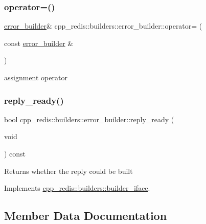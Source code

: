 \subsubsection{\texorpdfstring{operator=()}{operator=()}}
{\footnotesize\ttfamily \hyperlink{classcpp__redis_1_1builders_1_1error__builder}{error\+\_\+builder}\& cpp\+\_\+redis\+::builders\+::error\+\_\+builder\+::operator= (\begin{DoxyParamCaption}\item[{const \hyperlink{classcpp__redis_1_1builders_1_1error__builder}{error\+\_\+builder} \&}]{ }\end{DoxyParamCaption})\hspace{0.3cm}{\ttfamily [delete]}}



assignment operator 

\mbox{\label{classcpp__redis_1_1builders_1_1error__builder_af3d67647f012d0a7378684e2f8258a6d}} 
\subsubsection{\texorpdfstring{reply\+\_\+ready()}{reply\_ready()}}
{\footnotesize\ttfamily bool cpp\+\_\+redis\+::builders\+::error\+\_\+builder\+::reply\+\_\+ready (\begin{DoxyParamCaption}\item[{void}]{ }\end{DoxyParamCaption}) const\hspace{0.3cm}{\ttfamily [virtual]}}

\begin{DoxyReturn}{Returns}
whether the reply could be built 
\end{DoxyReturn}


Implements \hyperlink{classcpp__redis_1_1builders_1_1builder__iface_a40db9a31d4ea1771777e74146d31e12d}{cpp\+\_\+redis\+::builders\+::builder\+\_\+iface}.



\subsection{Member Data Documentation}
\mbox{\label{classcpp__redis_1_1builders_1_1error__builder_abe93a1cef2b5c63f7d1879c78af68fe7}} 
